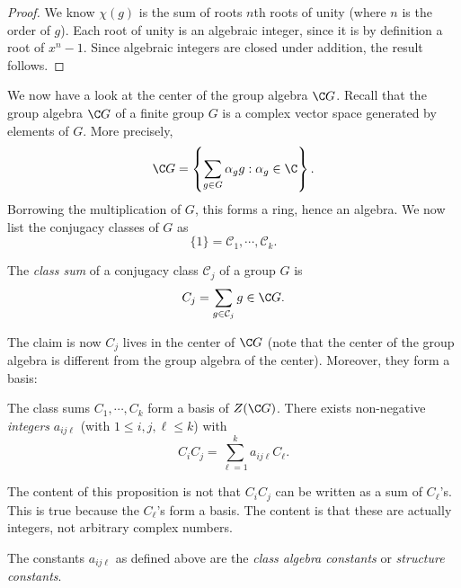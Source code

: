 \documentclass[a4paper]{article}
\begin{document}
\begin{proof}
  We know $\chi(g)$ is the sum of roots $n$th roots of unity (where $n$ is the order of $g$). Each root of unity is an algebraic integer, since it is by definition a root of $x^n - 1$. Since algebraic integers are closed under addition, the result follows.
\end{proof}

We now have a look at the center of the group algebra $\C G$. Recall that the group algebra $\C G$ of a finite group $G$ is a complex vector space generated by elements of $G$. More precisely,
\[
  \C G = \left\{\sum_{g \in G} \alpha_g g: \alpha_g \in \C\right\}.
\]
Borrowing the multiplication of $G$, this forms a ring, hence an algebra. We now list the conjugacy classes of $G$ as
\[
  \{1\} = \mathcal{C}_1, \cdots, \mathcal{C}_k.
\]
\begin{defi}
  The \emph{class sum} of a conjugacy class $\mathcal{C}_j$ of a group $G$ is
  \[
    C_j = \sum_{g \in \mathcal{C}_j} g \in \C G.
  \]
\end{defi}

The claim is now $C_j$ lives in the center of $\C G$ (note that the center of the group algebra is different from the group algebra of the center). Moreover, they form a basis:
\begin{prop}
  The class sums $C_1, \cdots, C_k$ form a basis of $Z(\C G)$. There exists non-negative \emph{integers} $a_{ij\ell}$ (with $1 \leq i, j, \ell \leq k$) with
  \[
    C_i C_j = \sum_{\ell = 1}^k a_{ij\ell} C_\ell.
  \]
\end{prop}
The content of this proposition is not that $C_i C_j$ can be written as a sum of $C_\ell$'s. This is true because the $C_\ell$'s form a basis. The content is that these are actually integers, not arbitrary complex numbers.

\begin{defi}
  The constants $a_{ij\ell}$ as defined above are the \emph{class algebra constants} or \emph{structure constants}.
\end{defi}
\end{document}
